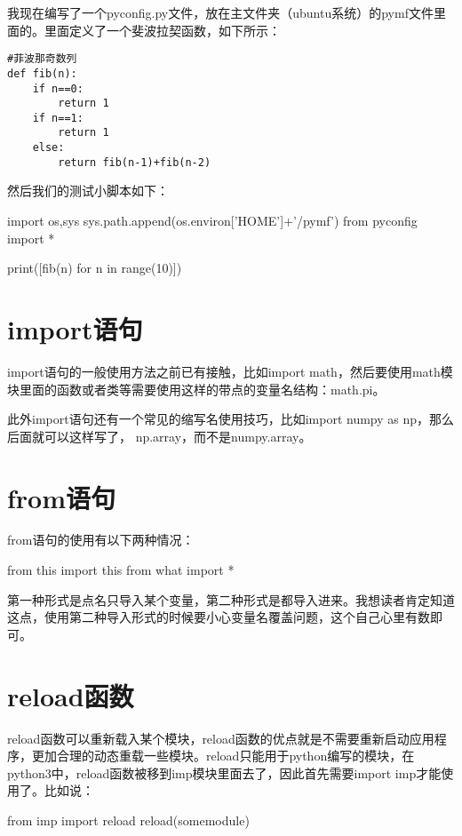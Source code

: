 \documentclass[12pt,oneside]{book}
\begin{document}
\begin{common-format}
我现在编写了一个pyconfig.py文件，放在主文件夹（ubuntu系统）的pymf文件里面的。里面定义了一个斐波拉契函数，如下所示：
\begin{Verbatim}
#菲波那奇数列
def fib(n):
    if n==0:
        return 1
    if n==1:
        return 1
    else:
        return fib(n-1)+fib(n-2)
\end{Verbatim}

然后我们的测试小脚本如下：

\begin{tcbpython}[]
import os,sys
sys.path.append(os.environ['HOME']+'/pymf')
from pyconfig import *

print([fib(n) for n in range(10)])
\end{tcbpython}



\section{import语句}
import语句的一般使用方法之前已有接触，比如import math，然后要使用math模块里面的函数或者类等需要使用这样的带点的变量名结构：math.pi。

此外import语句还有一个常见的缩写名使用技巧，比如import numpy as np，那么后面就可以这样写了， np.array，而不是numpy.array。


\section{from语句}
from语句的使用有以下两种情况：

\begin{tcbpython}[]
from this import this
from what import *
\end{tcbpython}

第一种形式是点名只导入某个变量，第二种形式是都导入进来。我想读者肯定知道这点，使用第二种导入形式的时候要小心变量名覆盖问题，这个自己心里有数即可。



\section{reload函数}
reload函数可以重新载入某个模块，reload函数的优点就是不需要重新启动应用程序，更加合理的动态重载一些模块。reload只能用于python编写的模块，在python3中，reload函数被移到imp模块里面去了，因此首先需要import imp才能使用了。比如说：

\begin{tcbpython}[]
from imp import reload
reload(somemodule)
\end{tcbpython}






\end{common-format}
\end{document}
